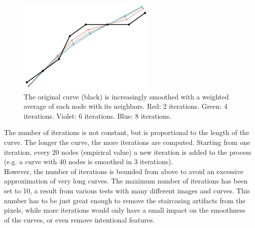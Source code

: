 \documentclass[]{usiinfbachelorproject}
\begin{document}
\begin{figure}[ht]
	\centering
	\includegraphics[width=0.6\textwidth]{img/avg.png}
	\caption{The original curve (black) is increasingly smoothed with a weighted average of each node with its neighbors. Red: 2 iterations. Green: 4 iterations. Violet: 6 iterations. Blue: 8 iterations.}
	\label{fig:smoothiter}
\end{figure}

\noindent The number of iterations is not constant, but is proportional to the length of the curve. The longer the curve, the more iterations are computed. Starting from one iteration, every 20 nodes (empirical value) a new iteration is added to the process (e.g. a curve with 40 nodes is smoothed in 3 iterations).\\
However, the number of iterations is bounded from above to avoid an excessive approximation of very long curves. The maximum number of iterations has been set to 10, a result from various tests with many different images and curves. This number has to be just great enough to remove the staircasing artifacts from the pixels, while more iterations would only have a small impact on the smoothness of the curves, or even remove intentional features. 
\end{document}

